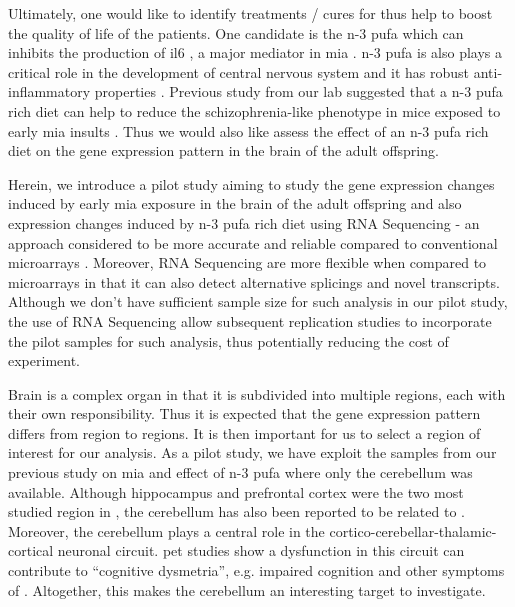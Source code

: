 Ultimately, one would like to identify treatments / cures for  thus help to boost the quality of life of the  patients.
One candidate is the n-3 \gls{pufa} which can inhibits the production of \gls{il6} \citep{Trebble2003}, a major mediator in \gls{mia} \citep{Smith2007}.
n-3 \gls{pufa} is also plays a critical role in the development of central nervous system \citep{Clandinin1999} and it has robust anti-inflammatory properties \citep{Trebble2003}.
Previous study from our lab suggested that a n-3 \gls{pufa} rich diet can help to reduce the schizophrenia-like phenotype in mice exposed to early \gls{mia} insults \citep{Li2015}. 
Thus we would also like assess the effect of an n-3 \gls{pufa} rich diet on the gene expression pattern in the brain of the adult offspring.

Herein, we introduce a pilot study aiming to study the gene expression changes induced by early \gls{mia} exposure in the brain of the adult offspring and also expression changes induced by n-3 \gls{pufa} rich diet using RNA Sequencing - an approach considered to be more accurate and reliable compared to conventional microarrays \citep{Wang2009d}.
Moreover, RNA Sequencing are more flexible when compared to microarrays in that it can also detect alternative splicings and novel transcripts. 
Although we don't have sufficient sample size for such analysis in our pilot study, the use of RNA Sequencing allow subsequent replication studies to incorporate the pilot samples for such analysis, thus potentially reducing the cost of experiment.

Brain is a complex organ in that it is subdivided into multiple regions, each with their own responsibility.
Thus it is expected that the gene expression pattern differs from region to regions.
It is then important for us to select a region of interest for our analysis. 
As a pilot study, we have exploit the samples from our previous study on \gls{mia} and effect of n-3 \gls{pufa} \citep{Li2015} where only the cerebellum was available.
Although hippocampus \citep{Velakoulis2006,Nugent2007} and prefrontal cortex \citep{Knable1997,Perlstein2001} were the two most studied region in , the cerebellum has also been reported to be related to  \citep{Yeganeh-Doost2011,Andreasen2008}.
Moreover, the cerebellum plays a central role in the cortico-cerebellar-thalamic-cortical neuronal circuit.
\Gls{pet} studies show a dysfunction in this  circuit can contribute to ``cognitive dysmetria'', e.g. impaired cognition and other symptoms of  \citep{Yeganeh-Doost2011}.
Altogether, this makes the cerebellum an interesting target to investigate.

